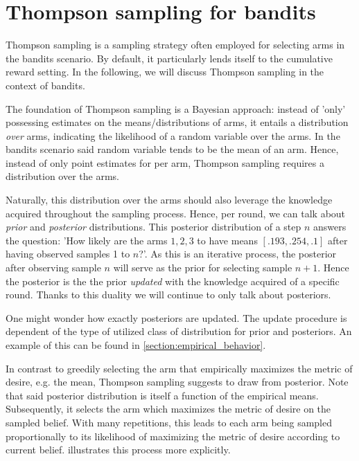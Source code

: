 \section{Thompson sampling for bandits}

Thompson sampling is a sampling strategy often employed for selecting arms in
the bandits scenario. By default, it particularly lends itself to the cumulative
reward setting. In the following, we will discuss Thompson sampling in the
context of bandits.

The foundation of Thompson sampling is a Bayesian approach: instead of 'only'
possessing estimates on the means/distributions of arms, it entails a
distribution \emph{over} arms, indicating the likelihood of a random variable
over the arms. In the bandits scenario said random variable tends to be the mean
of an arm. Hence, instead of only point estimates for per arm, Thompson sampling requires a distribution over the arms.

Naturally, this distribution over the arms should also leverage the knowledge
acquired throughout the sampling process. Hence, per round, we can talk about
\emph{prior} and \emph{posterior} distributions. This posterior distribution of
a step $n$ answers the question: 'How likely are the arms $1, 2, 3$ to have
means $[.193, .254, .1]$ after having observed samples 1 to $n$?'. As this is an
iterative process, the posterior after observing sample $n$ will serve as the
prior for selecting sample $n+1$. Hence the posterior is the the prior
\emph{updated} with the knowledge acquired of a specific round. Thanks to this
duality we will continue to only talk about posteriors.

One might wonder how exactly posteriors are updated. The update procedure is
dependent of the type of utilized class of distribution for prior and
posteriors. An example of this can be found in \ref{section:empirical_behavior}.

In contrast to greedily selecting the arm that empirically maximizes the metric
of desire, e.g. the mean, Thompson sampling suggests to draw from posterior.
Note that said posterior distribution is itself a function of the empirical
means. Subsequently, it selects the arm which maximizes the metric of desire on
the sampled belief. With many repetitions, this leads to each arm being sampled
proportionally to its likelihood of maximizing the metric of desire according to
current belief.  illustrates this process more
explicitly.

